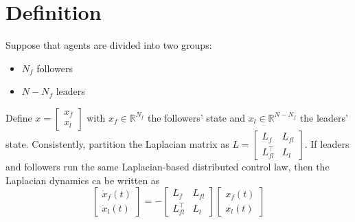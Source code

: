 \documentclass{book}
\newcommand{\R}{\mathbb{R}}
\theoremstyle{theoremv2}
\theoremstyle{defv2}
\theoremstyle{remark}
\theoremstyle{remark}
\theoremstyle{definition}
\theoremstyle{definition}
\begin{document}
\section{Definition}
Suppose that agents are divided into two groups: 
\begin{itemize}
    \item $N_f$ followers
    \item $N-N_f$ leaders
\end{itemize}
Define $x = \begin{bmatrix}
    x_f \\ x_l
\end{bmatrix}$ with $x_f\in\R^{N_f}$ the followers' state and $x_l\in\R^{N-N_f}$ the leaders' state.
Consistently, partition the Laplacian matrix as $L = \begin{bmatrix}
    L_f & L_{fl} \\ L_{fl}^\top & L_l
\end{bmatrix}$.
If leaders and followers run the same Laplacian-based distributed control law, then the Laplacian dynamics ca be written as 
\[
    \begin{bmatrix}
        \dot{x}_f(t) \\ \dot{x}_l(t) 
    \end{bmatrix} = -\begin{bmatrix}
        L_f & L_{fl} \\ L_{fl}^\top & L_l
    \end{bmatrix} \begin{bmatrix}
        x_f(t) \\ x_l(t)
    \end{bmatrix}
\]
\end{document}
